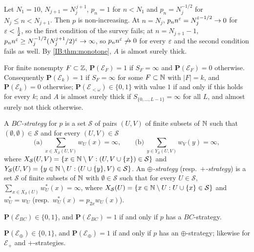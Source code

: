 \begin{example}
\label{IB:ex:gap}
Let $N_1=10$, $N_{j+1}=N_j^{\,j+1}$, $p_n=1$ for $n<N_1$ and $p_n=N_j^{-1/2}$ for
$N_j\le n<N_{j+1}$. Then $p$ is non-increasing. At $n=N_j$, $p_nn^\varepsilon=N_j^{\varepsilon-1/2}\to0$
for $\varepsilon<\frac12$, so the first condition of the survey fails; at $n=N_{j+1}-1$,
$p_nn^\varepsilon\ge N_j^{-1/2}(N_j^{j+1}/2)^\varepsilon\to\infty$, so $p_nn^\varepsilon\not\to0$ for every $\varepsilon$
and the second condition fails as well. By \cref{IB:thm:monotone}, $A$ is almost
surely thick.
\end{example}

\begin{theorem}
\label{IB:thm:finite}
For finite nonempty $F\subset\mathbb{Z}$, $\mathbf P(\mathcal E_F)=1$ if $S_F=\infty$ and $\mathbf P(\mathcal E_F)=0$
otherwise. Consequently $\mathbf P(\mathcal E_k)=1$ if $S_F=\infty$ for some $F\subset\mathbb{N}$ with
$|F|=k$, and $\mathbf P(\mathcal E_k)=0$ otherwise; $\mathbf P(\mathcal E_{<\omega})\in\{0,1\}$ with value $1$
if and only if this holds for every $k$; and $A$ is almost surely thick if
$S_{\{0,\dots,L-1\}}=\infty$ for all $L$, and almost surely not thick otherwise.
\end{theorem}

\begin{definition}
\label{IB:def:strategy}
A \emph{$BC$-strategy} for $p$ is a set $\mathcal S$ of pairs $(U,V)$ of finite subsets
of $\mathbb{N}$ such that $(\emptyset,\emptyset)\in\mathcal S$ and for every $(U,V)\in\mathcal S$
\[
\text{(a)}\ \sum_{x\in X_{\mathcal S}(U,V)}w_U(x)=\infty,\qquad
\text{(b)}\ \sum_{y\in Y_{\mathcal S}(U,V)}w_V(y)=\infty,
\]
where $X_{\mathcal S}(U,V)=\{x\in\mathbb{N}\setminus V:(U,V\cup\{x\})\in\mathcal S\}$ and
$Y_{\mathcal S}(U,V)=\{y\in\mathbb{N}\setminus U:(U\cup\{y\},V)\in\mathcal S\}$.
An \emph{$\oplus$-strategy} (resp.\ \emph{$+$-strategy}) is a set $\mathcal S$ of finite
subsets of $\mathbb{N}$ with $\emptyset\in\mathcal S$ such that for every $U\in\mathcal S$,
$\sum_{x\in X_{\mathcal S}(U)}w^\ast_U(x)=\infty$, where
$X_{\mathcal S}(U)=\{x\in\mathbb{N}\setminus U:U\cup\{x\}\in\mathcal S\}$ and $w^\ast_U=w_U$ (resp.\
$w^\ast_U(x)=p_{2x}w_U(x)$).
\end{definition}

\begin{theorem}
\label{IB:thm:strategy}
$\mathbf P(\mathcal E_{BC})\in\{0,1\}$, and $\mathbf P(\mathcal E_{BC})=1$ if and only if $p$ has a
$BC$-strategy.
\end{theorem}

\begin{theorem}
\label{IB:thm:strategy2}
$\mathbf P(\mathcal E_\oplus)\in\{0,1\}$, and $\mathbf P(\mathcal E_\oplus)=1$ if and only if $p$ has an
$\oplus$-strategy; likewise for $\mathcal E_+$ and $+$-strategies.
\end{theorem}

